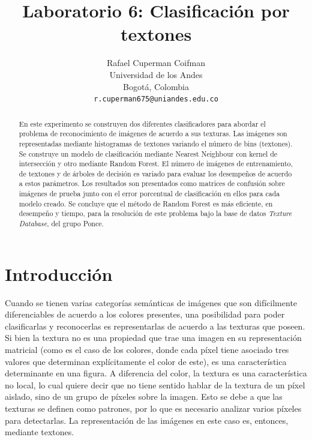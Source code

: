 \documentclass[10pt,twocolumn,letterpaper]{article}
\begin{document}
\title{Laboratorio 6: Clasificación por textones}

\author{Rafael Cuperman Coifman\\
Universidad de los Andes\\
Bogotá, Colombia\\
{\tt\small r.cuperman675@uniandes.edu.co}
}

\maketitle

\begin{abstract}
 En este experimento se construyen dos diferentes clasificadores para abordar el problema de reconocimiento de imágenes de acuerdo a sus texturas. Las imágenes son representadas mediante histogramas de textones variando el número de bins (textones). Se construye un modelo de clasificación mediante Nearest Neighbour con kernel de intersección y otro mediante Random Forest. El número de imágenes de entrenamiento, de textones y de árboles de decisión es variado para evaluar los desempeños de acuerdo a estos parámetros. Los resultados son presentados como matrices de confusión sobre imágenes de prueba junto con el error porcentual de clasificación en ellos para cada modelo creado. Se concluye que el método de Random Forest es más eficiente, en desempeño y tiempo, para la resolución de este problema bajo la base de datos \textit{Texture Database}, del grupo Ponce.
\end{abstract}

\section{Introducción}
Cuando se tienen varias categorías semánticas de imágenes que son difícilmente diferenciables de acuerdo a los colores presentes, una posibilidad para poder clasificarlas y reconocerlas es representarlas de acuerdo a las texturas que poseen. Si bien la textura no es una propiedad que trae una imagen en su representación matricial (como es el caso de los colores, donde cada píxel tiene asociado tres valores que determinan explícitamente el color de este), es una característica determinante en una figura. A diferencia del color, la textura es una característica no local, lo cual quiere decir que no tiene sentido hablar de la textura de un píxel aislado, sino de un grupo de píxeles sobre la imagen. Esto se debe a que las texturas se definen como patrones, por lo que es necesario analizar varios píxeles para detectarlas. La representación de las imágenes en este caso es, entonces, mediante textones.
\end{document}

